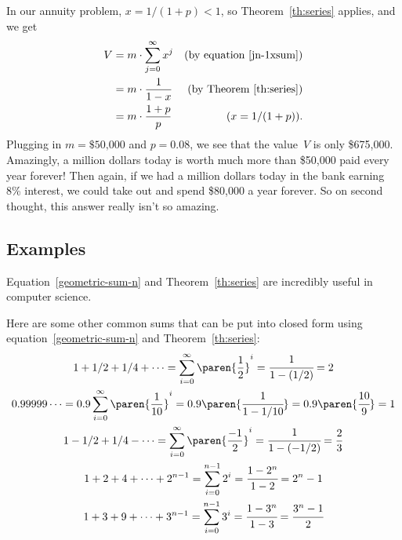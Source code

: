 In our annuity problem, $x=1/(1+p) < 1$, so Theorem~\ref{th:series}
applies, and we get
\begin{align*}
V & = m \cdot \sum_{j=0}^{\infty} x^j & \text{(by equation~\ref{jn-1xsum})}\\
  &= m\cdot \frac{1}{1-x} & \text{(by Theorem~\ref{th:series})}\\ &=
m\cdot \frac{1 + p}{p} &(x = 1/(1+p)).
\end{align*}
Plugging in $m = \text{\$50,000}$ and $p = 0.08$, we see that the
value~$V$ is only \$675,000.  Amazingly, a million dollars today is
worth much more than \$50,000 paid every year forever!  Then again, if
we had a million dollars today in the bank earning 8\% interest, we
could take out and spend \$80,000 a year forever.  So on second
thought, this answer really isn't so amazing.

\subsection{Examples}

Equation~\ref{geometric-sum-n} and Theorem~\ref{th:series} are
incredibly useful in computer science.  

Here are some other common sums that can be put into closed form using
equation~\ref{geometric-sum-n} and Theorem~\ref{th:series}:
\begingroup {}
\begin{gather}
1 + 1/2 + 1/4 + \cdots = \sum_{i=0}^\infty \paren{\frac{1}{2}}^i %
= \cfrac{1}{1-(1/2)} = 2 \label{is2} \\ 0.99999\dots = 0.9
\sum_{i=0}^{\infty} \paren{\frac{1}{10}}^i = 0.9
\paren{\cfrac{1}{1-1/10}} = 0.9 \paren{\cfrac{10}{9}} = 1 \label{is1}
\\ 1 - 1/2 + 1/4 - \cdots = \sum_{i=0}^\infty \paren{\frac{-1}{2}}^i =
\cfrac{1}{1-(-1/2)} = \frac{2}{3} \label{is23} \\ 1 + 2 + 4 + \cdots +
2^{n-1} = \sum_{i=0}^{n-1} 2^i = \cfrac{1 - 2^n}{1 - 2} = 2^n -
1 \label{is2n1} \\ 1 + 3 + 9 + \cdots + 3^{n-1} = \sum_{i=0}^{n-1} 3^i
= \cfrac{1 - 3^n}{1 - 3} = \cfrac{3^n - 1}{2} \label{is3n1}
\end{gather}
\endgroup

